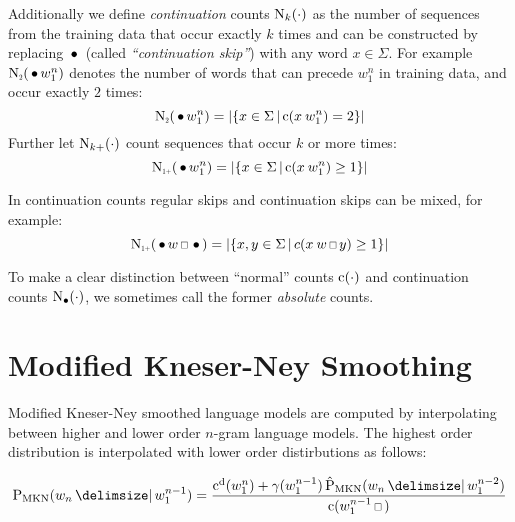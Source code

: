 Additionally we define \emph{continuation} counts $\operatorname{N}_k(\cdot)$ as
the number of sequences from the training data that occur exactly $k$ times and
can be constructed by replacing $\,\bullet\,$ (called \emph{``continuation skip''})
with any word $x \in \Sigma$.
For example $\ContCountII(\WSkp w_1^n)$ denotes the number of words that can
precede $w_1^n$ in training data, and occur exactly $2$ times:
\begin{equation}
  \ContCountII(\WSkp w_1^n) =
    \Cardinality{\left\{ x \in \Sigma \,\middle|\, \Count(x \: w_1^n) = 2 \right\}}
\end{equation}
Further let $\operatorname{N}_{k+}(\cdot)$ count sequences that occur $k$ or more
times:
\begin{equation}
  \ContCountIp(\WSkp w_1^n) =
    \Cardinality{\left\{ x \in \Sigma \,\middle|\, \Count(x \: w_1^n) \geq 1 \right\}}
\end{equation}

In continuation counts regular skips and continuation skips can be mixed, for
example:
\begin{equation}
  \ContCountIp(\WSkp w \Skp \WSkp) =
    \Cardinality{\left\{ x, y \in \Sigma \,\middle|\, c(x \: w \Skp y) \geq 1 \right\}}
\end{equation}

To make a clear distinction between ``normal'' counts $\operatorname{c}(\cdot)$ and
continuation counts $\operatorname{N}_{\bullet}(\cdot)$, we
sometimes call the former \emph{absolute} counts.

\section{Modified Kneser-Ney Smoothing}
\label{sec:review-lm-mkn}

\begin{draft}
Modified Kneser-Ney smoothed language models are computed by interpolating
between higher and lower order $n$-gram language models.
The highest order distribution is interpolated with lower order distirbutions
as follows:
\end{draft}
\begin{equation}
  \label{eq:mkn-high}
  \ProbMKN{w_n}{w_1^{n-1}} =
    \frac{\DiscountedCount(w_1^n) + \gamma(w_1^{n-1}) \ProbMKN*{w_n}{w_1^{n-2}}}
         {\Count(w_1^{n-1} \Skp)} \\
\end{equation}

